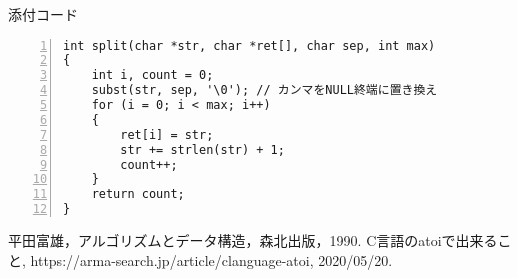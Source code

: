 \documentclass[autodetect-engine,dvi=dvipdfmx,ja=standard,
               a4j,11pt]{bxjsarticle}
\begin{document}
添付コード

\begin{Verbatim}[numbers=left, xleftmargin=10mm, numbersep=6pt,
    fontsize=\small, baselinestretch=0.8]
int split(char *str, char *ret[], char sep, int max)
{
    int i, count = 0;
    subst(str, sep, '\0'); // カンマをNULL終端に置き換え
    for (i = 0; i < max; i++)
    {
        ret[i] = str;
        str += strlen(str) + 1;
        count++;
    }
    return count;
}
\end{Verbatim}


\begin{thebibliography}{99}
   平田富雄，アルゴリズムとデータ構造，森北出版，1990.
   C言語のatoiで出来ること, https://arma-search.jp/article/clanguage-atoi, 2020/05/20.
\end{thebibliography}

\end{document}
